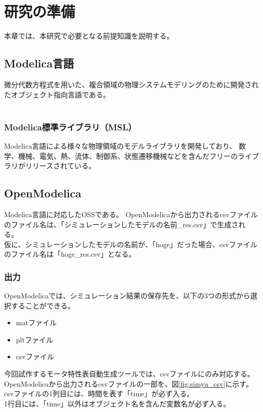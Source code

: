 \chapter{研究の準備}\label{cha:Preparation}
本章では、本研究で必要となる前提知識を説明する。
\section{Modelica言語}\label{modelica}
微分代数方程式を用いた、複合領域の物理システムモデリングのために開発されたオブジェクト指向言語である。\\
　\subsection{Modelica標準ライブラリ（MSL）}\label{MSL}
        Modelica言語による様々な物理領域のモデルライブラリを開発しており、
        数学、機械、電気、熱、流体、制御系、状態遷移機械などを含んだフリーのライブラリがリリースされている。

\section{OpenModelica}\label{OM}
Modelica言語に対応したOSSである\cite{fritzson2006openmodelica}。
OpenModelicaから出力されるcsvファイルのファイル名は、「シミュレーションしたモデルの名前\_res.csv」で生成される。\\
仮に、シミュレーションしたモデルの名前が、「hoge」だった場合、csvファイルのファイル名は「hoge\_res.csv」となる。
\subsection{出力}\label{sub:output}
OpenModelicaでは、シミュレーション結果の保存先を、以下の3つの形式から選択することができる。
\begin{itemize}
    \item matファイル
    \item pltファイル
    \item csvファイル
\end{itemize}
今回試作するモータ特性表自動生成ツールでは、csvファイルにのみ対応する。\\
OpenModelicaから出力されるcsvファイルの一部を、図\ref{fig:simyu_csv}に示す。\\
csvファイルの1列目には、時間を表す「time」が必ず入る。\\
1行目には、「time」以外はオブジェクト名を含んだ変数名が必ず入る。\\

